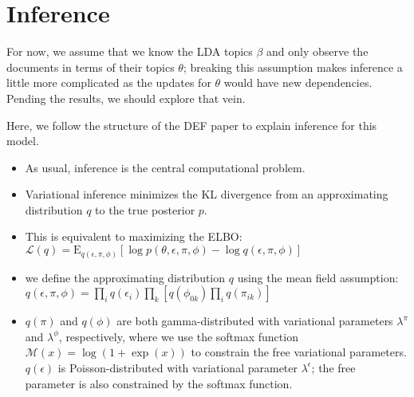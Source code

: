 \documentclass{article}
\newcommand{\E}{\mathrm{E}}
\begin{document}
\section{Inference}
For now, we assume that we know the LDA topics $\beta$ and only observe the documents in terms of their topics $\theta$; breaking this assumption makes inference a little more complicated as the updates for $\theta$ would have new dependencies.  Pending the results, we should explore that vein. 

Here, we follow the structure of the DEF paper to explain inference for this model.

\begin{itemize}
\item As usual, inference is the central computational problem.
\item Variational inference minimizes the KL divergence from an approximating distribution $q$ to the true posterior $p$.
\item This is equivalent to maximizing the ELBO: $\mathcal{L}(q)  = \E_{q(\epsilon, \pi, \phi)}[\log p(\theta,\epsilon,\pi,\phi) - \log q(\epsilon, \pi, \phi)]$
\item we define the approximating distribution $q$ using the mean field assumption: $q(\epsilon, \pi, \phi) = \prod_i q(\epsilon_{i})\prod_k\left[q(\phi_{0k})\prod_i q(\pi_{ik})\right]$ 
\item $q(\pi)$ and $q(\phi)$ are both gamma-distributed with variational parameters $\lambda^\pi$ and $\lambda^\phi$, respectively, where we use the softmax function $\mathcal{M}(x) = \log(1+\exp(x))$ to constrain the free variational parameters.
$q(\epsilon)$ is Poisson-distributed with variational parameter $\lambda^\epsilon$; the free parameter is also constrained by the softmax function.


\end{itemize}
\end{document}
